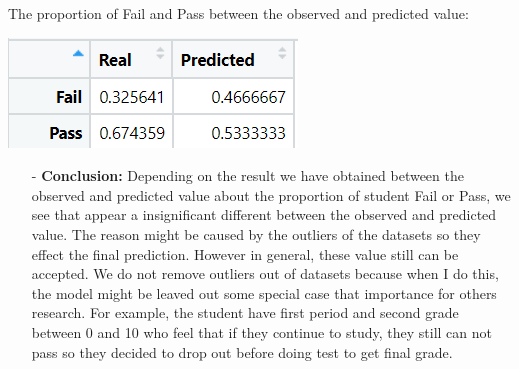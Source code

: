 \documentclass[a4paper]{article}
\numberwithin{equation}{section}
\begin{document}
The proportion of Fail and Pass between the observed and predicted value:

\begin{center}
  {\includegraphics{proportion.PNG}}
\end{center}

\begin{itemize}
  \item[-] \textbf{Conclusion:} Depending on the result we have obtained between the observed and predicted value about the proportion of student Fail or Pass, we see that appear a insignificant different between the observed and predicted value. The reason might be caused by the outliers of the datasets so they effect the final prediction. However in general, these value still can be accepted. We do not remove outliers out of datasets because when I do this, the model might be leaved out some special case that importance for others research. For example, the student have first period and second grade between 0 and 10 who feel that if they continue to study, they still can not pass so they decided to drop out before doing test to get final grade.
\end{itemize}

\newpage
\end{document}
